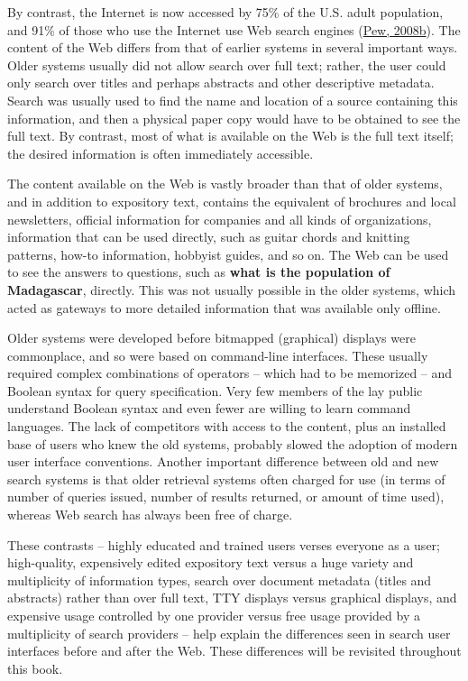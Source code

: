 \documentclass[sigconf,nonacm,screen,pbalance]{acmart}
\begin{document}
By contrast, the Internet is now accessed by 75\% of the U.S. adult population, and 91\% of those who use
the Internet use Web search engines (\href{https://searchuserinterfaces.com/book/sui_references.html#pewtracking2008}{Pew, 2008b}). The content of the Web differs
from that of earlier systems in several important ways. Older systems usually did not allow search over
full text; rather, the user could only search over titles and perhaps abstracts and other descriptive
metadata. Search was usually used to find the name and location of a source containing this information,
and then a physical paper copy would have to be obtained to see the full text. By contrast, most of what
is available on the Web is the full text itself; the desired information is often immediately accessible.

The content available on the Web is vastly broader than that of older systems, and in addition to
expository text, contains the equivalent of brochures and local newsletters, official information for
companies and all kinds of organizations, information that can be used directly, such as guitar chords and
knitting patterns, how-to information, hobbyist guides, and so on. The Web can be used to see the answers
to questions, such as {\bf  what is the population of Madagascar}, directly. This was not usually
possible in the older systems, which acted as gateways to more detailed information that was available
only offline.

Older systems were developed before bitmapped (graphical) displays were commonplace, and so were based on
command-line interfaces. These usually required complex combinations of operators -- which had to be
memorized -- and Boolean syntax for query specification. Very few members of the lay public understand
Boolean syntax and even fewer are willing to learn command languages. The lack of competitors with access
to the content, plus an installed base of users who knew the old systems, probably slowed the adoption of
modern user interface conventions. Another important difference between old and new search systems is that
older retrieval systems often charged for use (in terms of number of queries issued, number of results
returned, or amount of time used), whereas Web search has always been free of charge.

These contrasts -- highly educated and trained users verses everyone as a user; high-quality, expensively
edited expository text versus a huge variety and multiplicity of information types, search over document
metadata (titles and abstracts) rather than over full text, TTY displays versus graphical displays, and
expensive usage controlled by one provider versus free usage provided by a multiplicity of search
providers -- help explain the differences seen in search user interfaces before and after the Web. These
differences will be revisited throughout this book.
\end{document}
